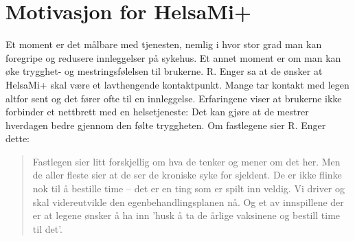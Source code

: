 \section{Motivasjon for HelsaMi+}
Et moment er det målbare med tjenesten, nemlig i hvor stor grad man kan foregripe og redusere innleggelser på sykehus. Et annet moment er om man kan
øke trygghet- og mestringsfølelsen til brukerne. R. Enger sa at de ønsker at HelsaMi+ skal være et lavthengende kontaktpunkt. Mange tar kontakt
med legen altfor sent og det fører ofte til en innleggelse. Erfaringene viser at brukerne ikke forbinder et nettbrett med en
helsetjeneste:  Det kan gjøre at de mestrer
hverdagen bedre gjennom den følte tryggheten. Om fastlegene sier R. Enger dette: \blockquote{Fastlegen sier litt forskjellig om hva de tenker og mener
om det her. Men de aller fleste sier at de ser de kroniske syke for sjeldent. De er ikke flinke nok til å bestille time -- det
er en ting som er spilt inn veldig. Vi driver og skal videreutvikle den
egenbehandlingsplanen nå. Og et av innspillene der er at legene ønsker å ha inn 'husk å ta de årlige vaksinene og bestill time til det'.}

